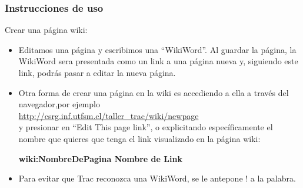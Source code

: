 \subsubsection{Instrucciones de uso}
Crear una página wiki:
  \begin{itemize}
    \item Editamos una página y escribimos una ``WikiWord''. Al guardar la página, la WikiWord sera presentada como un link a una página nueva y, siguiendo este link, podrás pasar a editar la nueva página.
    \item Otra forma de crear una página en la wiki es accediendo a ella a
    través del navegador,por ejemplo\\
    \url{http://csrg.inf.utfsm.cl/taller_trac/wiki/newpage}\\ y presionar en
    ``Edit This page link'', o explicitando específicamente el nombre que
    quieres que tenga el link visualizado en la página wiki:
        \begin{center}\textbf{\lbrack wiki:NombreDePagina Nombre de Link\rbrack}\end{center}
    \item Para evitar que Trac reconozca una WikiWord, se le antepone ! a la palabra.
  \end{itemize}


